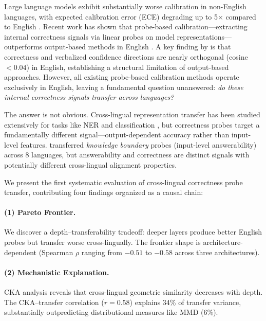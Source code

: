 \documentclass[11pt,a4paper]{article}
\begin{document}
Large language models exhibit substantially worse calibration in non-English languages, with expected calibration error (ECE) degrading up to 5$\times$ compared to English \cite{ahuja2024globalmmlu,lai2024llmsurvey}. Recent work has shown that probe-based calibration---extracting internal correctness signals via linear probes on model representations---outperforms output-based methods in English \cite{miao2026coral,burns2023discovering}. A key finding by \citet{miao2026orthogonality} is that correctness and verbalized confidence directions are nearly orthogonal (cosine $< 0.04$) in English, establishing a structural limitation of output-based approaches. However, all existing probe-based calibration methods operate exclusively in English, leaving a fundamental question unanswered: \emph{do these internal correctness signals transfer across languages?}

The answer is not obvious. Cross-lingual representation transfer has been studied extensively for tasks like NER and classification \cite{pires2019multilingual,conneau2020unsupervised}, but correctness probes target a fundamentally different signal---output-dependent accuracy rather than input-level features. \citet{xiao2025knowledgeboundary} transferred \emph{knowledge boundary} probes (input-level answerability) across 8 languages, but answerability and correctness are distinct signals with potentially different cross-lingual alignment properties.

We present the first systematic evaluation of cross-lingual correctness probe transfer, contributing four findings organized as a causal chain:

\paragraph{(1) Pareto Frontier.} We discover a depth--transferability tradeoff: deeper layers produce better English probes but transfer worse cross-lingually. The frontier shape is architecture-dependent (Spearman $\rho$ ranging from $-0.51$ to $-0.58$ across three architectures).

\paragraph{(2) Mechanistic Explanation.} CKA analysis reveals that cross-lingual geometric similarity decreases with depth. The CKA--transfer correlation ($r = 0.58$) explains 34\% of transfer variance, substantially outpredicting distributional measures like MMD (6\%).
\end{document}
